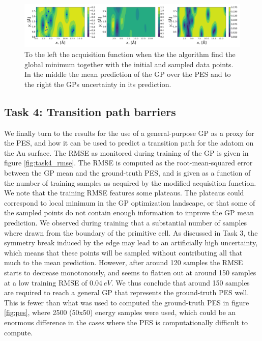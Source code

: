 \documentclass[11pt,a4paper]{article}
\begin{document}
\begin{figure}[ht]
    \hspace{-50pt}
    \includegraphics[width = 1.2\textwidth]{figures/task3_pred.png}
    \caption{To the left the acquisition function when the the algorithm find the global minimum together with the initial and sampled data points. In the middle the mean prediction of the GP over the PES and to the right the GPs uncertainty in its prediction. }
    \label{fig:task3_pred}
\end{figure}

\subsection[Task 4]{Task 4: Transition path barriers}
\label{sec:results_task4}

We finally turn to the results for the use of a general-purpose GP as a proxy for the PES, and how it can be used to predict a transition path for the adatom on the Au surface. The RMSE as monitored during training of the GP is given in figure \ref{fig:task4_rmse}. The RMSE is computed as the root-mean-squared error between the GP mean and the ground-truth PES, and is given as a function of the number of training samples as acquired by the modified acquisition function. We note that the training RMSE features some plateaus. The plateaus could correspond to local minimum in the GP optimization landscape, or that some of the sampled points do not contain enough information to improve the GP mean prediction. We observed during training that a substantial number of samples where drawn from the boundary of the primitive cell. As discussed in Task 3, the symmetry break induced by the edge may lead to an artificially high uncertainty, which means that these points will be sampled without contributing all that much to the mean prediction. However, after around 120 samples the RMSE starts to decrease monotonously, and seems to flatten out at around 150 samples at a low training RMSE of $\SI{0.04}{eV}$. We thus conclude that around 150 samples are required to reach a general GP that represents the ground-truth PES well. This is fewer than what was used to computed the ground-truth PES in figure \ref{fig:pes}, where 2500 (50x50) energy samples were used, which could be an enormous difference in the cases where the PES is computationally difficult to compute.
\end{document}

